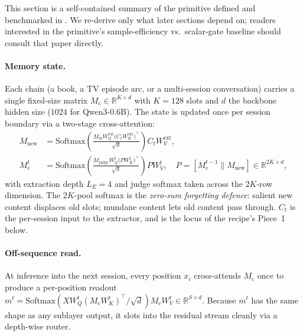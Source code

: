 \documentclass{article}
\newcommand{\Mc}{M_{\text{c}}}
\newcommand{\Min}{M_{\text{in}}}
\newcommand{\Mj}{M_{\text{judge}}}
\newcommand{\Mnew}{M_{\text{new}}}
\begin{document}
This section is a self-contained summary of the primitive defined
and benchmarked in \cite{liu2025drop}. We re-derive only what later
sections depend on; readers interested in the primitive's
sample-efficiency vs.\ scalar-gate baseline should consult that
paper directly.

\paragraph{Memory state.} Each chain (a book, a TV episode arc, or
a multi-session conversation) carries a single fixed-size matrix
$\Mc \in \mathbb{R}^{K\times d}$ with $K{=}128$ slots and $d$ the
backbone hidden size ($1024$ for Qwen3-0.6B). The state is updated
once per session boundary via a two-stage cross-attention:
\begin{align}
\Mnew &= \mathrm{Softmax}\!\left(\tfrac{\Min W_Q^{\text{ext}}\bigl(C_t W_K^{\text{ext}}\bigr)^\top}{\sqrt{d}}\right) C_t W_V^{\text{ext}},
\label{eq:extract}\\
\Mc^{t} &= \mathrm{Softmax}\!\left(\tfrac{\Mj W_Q^{\text{j}}\bigl(P W_K^{\text{j}}\bigr)^\top}{\sqrt{d}}\right) P W_V^{\text{j}},
\quad P = [\Mc^{t-1} \parallel \Mnew] \in \mathbb{R}^{2K\times d},
\label{eq:judge}
\end{align}
with extraction depth $L_E{=}4$ and judge softmax taken across the
$2K$-row dimension. The $2K$-pool softmax is the
\emph{zero-sum forgetting defence}: salient new content displaces
old slots; mundane content lets old content pass through.
$C_t$ is the per-session input to the extractor, and is the
locus of the recipe's Piece~1 below.

\paragraph{Off-sequence read.} At inference into the next session,
every position $x_i$ cross-attends $\Mc$ once to produce a
per-position readout
$m^t = \mathrm{Softmax}(X W_Q^{\text{r}}(\Mc W_K^{\text{r}})^\top/\sqrt{d})\Mc W_V^{\text{r}} \in \mathbb{R}^{S\times d}$.
Because $m^t$ has the same shape as any sublayer output, it slots
into the residual stream cleanly via a depth-wise router.
\end{document}
